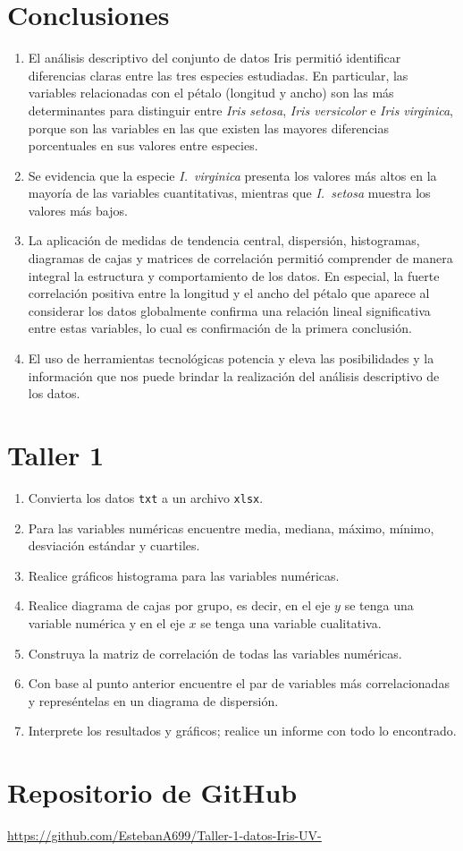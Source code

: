 \documentclass[12pt,a4paper]{article}
\begin{document}
\section{Conclusiones}

\begin{enumerate}
    \item El análisis descriptivo del conjunto de datos Iris permitió identificar diferencias claras entre las tres especies estudiadas. En particular, las variables relacionadas con el pétalo (longitud y ancho) son las más determinantes para distinguir entre \textit{Iris setosa}, \textit{Iris versicolor} e \textit{Iris virginica}, porque son las variables en las que existen las mayores diferencias porcentuales en sus valores entre especies.

    \item Se evidencia que la especie \textit{I.~virginica} presenta los valores más altos en la mayoría de las variables cuantitativas, mientras que \textit{I.~setosa} muestra los valores más bajos.

    \item La aplicación de medidas de tendencia central, dispersión, histogramas, diagramas de cajas y matrices de correlación permitió comprender de manera integral la estructura y comportamiento de los datos. En especial, la fuerte correlación positiva entre la longitud y el ancho del pétalo que aparece al considerar los datos globalmente confirma una relación lineal significativa entre estas variables, lo cual es confirmación de la primera conclusión.

    \item El uso de herramientas tecnológicas potencia y eleva las posibilidades y la información que nos puede brindar la realización del análisis descriptivo de los datos.
\end{enumerate}

\appendix

\section{Taller 1}

\begin{enumerate}
    \item Convierta los datos \texttt{txt} a un archivo \texttt{xlsx}.
    \item Para las variables numéricas encuentre media, mediana, máximo, mínimo, desviación estándar y cuartiles.
    \item Realice gráficos histograma para las variables numéricas.
    \item Realice diagrama de cajas por grupo, es decir, en el eje $y$ se tenga una variable numérica y en el eje $x$ se tenga una variable cualitativa.
    \item Construya la matriz de correlación de todas las variables numéricas.
    \item Con base al punto anterior encuentre el par de variables más correlacionadas y represéntelas en un diagrama de dispersión.
    \item Interprete los resultados y gráficos; realice un informe con todo lo encontrado.
\end{enumerate}

\section*{Repositorio de GitHub}

\url{https://github.com/EstebanA699/Taller-1-datos-Iris-UV-}
\end{document}
